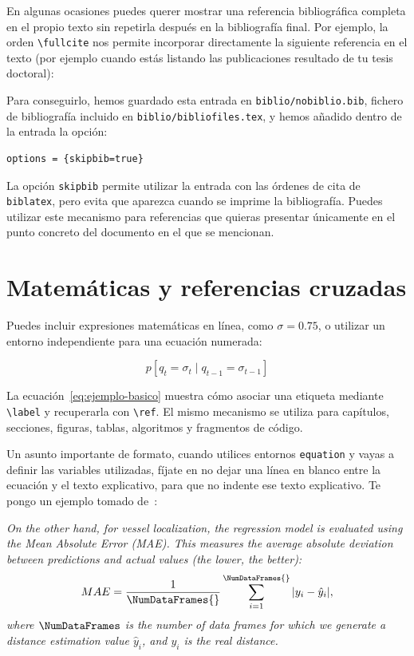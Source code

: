 En algunas ocasiones puedes querer mostrar una referencia bibliográfica completa en el propio texto sin repetirla después en la bibliografía final. Por ejemplo, la orden \texttt{\textbackslash{}fullcite} nos permite incorporar directamente la siguiente referencia en el texto (por ejemplo cuando estás listando las publicaciones resultado de tu tesis doctoral):


Para conseguirlo, hemos guardado esta entrada en \texttt{biblio/nobiblio.bib}, fichero de bibliografía incluido en \texttt{biblio/bibliofiles.tex}, y hemos añadido dentro de la entrada la opción:

\begin{verbatim}
options = {skipbib=true}
\end{verbatim}

La opción \texttt{skipbib} permite utilizar la entrada con las órdenes de cita de \texttt{biblatex}, pero evita que aparezca cuando se imprime la bibliografía. Puedes utilizar este mecanismo para referencias que quieras presentar únicamente en el punto concreto del documento en el que se mencionan.

\section{Matemáticas y referencias cruzadas}
\label{sec:matematicas-referencias}

Puedes incluir expresiones matemáticas en línea, como $\sigma=0.75$, o utilizar un entorno independiente para una ecuación numerada:

\begin{equation}
  \label{eq:ejemplo-basico}
  p[q_t=\sigma_t\mid q_{t-1}=\sigma_{t-1}]
\end{equation}

La ecuación~\ref{eq:ejemplo-basico} muestra cómo asociar una etiqueta mediante \texttt{\textbackslash{}label} y recuperarla con \texttt{\textbackslash{}ref}. El mismo mecanismo se utiliza para capítulos, secciones, figuras, tablas, algoritmos y fragmentos de código.

Un asunto importante de formato, cuando utilices entornos \texttt{equation} y vayas a definir las variables utilizadas, fíjate en no dejar una línea en blanco entre la ecuación y el texto explicativo, para que no indente ese texto explicativo. Te pongo un ejemplo tomado de~\cite{ramirez2026jstars}:

\textit{On the other hand, for vessel localization, the regression model is evaluated using the {Mean Absolute Error (MAE)}. This measures the average absolute deviation between predictions and actual values (the lower, the better):}
\begin{equation}
  MAE = \frac{1}{\NumDataFrames{}} \sum_{i=1}^{\NumDataFrames{}} |y_i - \hat{y}_i|,
\end{equation}
\textit{where $\NumDataFrames$ is the number of data frames for which we generate a distance estimation value $\hat{y}_{i}$, and $y_{i}$ is the real distance.}


